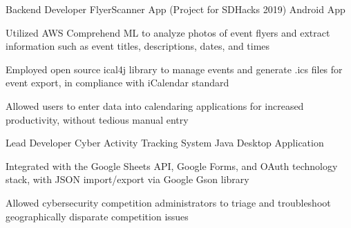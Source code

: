 

\begin{cventries}

  \cventry
    {Backend Developer} %
    {FlyerScanner App (Project for SDHacks 2019)} %
    {Android App} %
    {} %
    {
      \begin{cvitems} %
        \item {Utilized AWS Comprehend ML to analyze photos of event flyers and extract information such as event titles, descriptions, dates, and times}
        \item {Employed open source ical4j library to manage events and generate .ics files for event export, in compliance with iCalendar standard}
        \item {Allowed users to enter data into calendaring applications for increased productivity, without tedious manual entry}
      \end{cvitems}
    }
    
  \cventry
    {Lead Developer} %
    {Cyber Activity Tracking System} %
    {Java Desktop Application} %
    {} %
    {
      \begin{cvitems} %
        \item {Integrated with the Google Sheets API, Google Forms, and OAuth technology stack, with JSON import/export via Google Gson library}
        \item {Allowed cybersecurity competition administrators to triage and troubleshoot geographically disparate competition issues}
      \end{cvitems}
    }
    
\end{cventries}